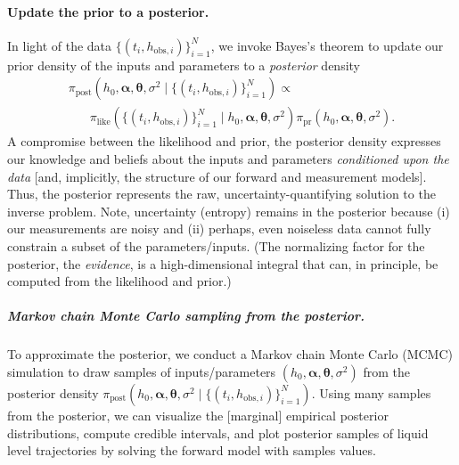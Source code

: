\documentclass[a4paper,fleqn]{cas-dc}
\newcommand\thedata {$\{(t_i,h_{\text{obs}, i})\}_{i=1}^{N}$\xspace}
\newcommand\thedatanomath {\{(t_i,h_{\text{obs}, i})\}_{i=1}^{N}}
\begin{document}
\paragraph{Update the prior to a posterior.}
In light of the data \thedata, we invoke Bayes's theorem  \cite{van2021bayesian,calvetti2018inverse} to update our prior density of the inputs and parameters to a \emph{posterior} density
\begin{multline}
	\pi_{\text{post}}(h_0, \boldsymbol \alpha, \boldsymbol \theta, \sigma^2 \mid \thedatanomath) \propto \\ %
	\phantom{xxx} \pi_{\text{like}}(\thedatanomath \mid h_0,  \boldsymbol \alpha, \boldsymbol \theta, \sigma^2 ) 
	\pi_{\text{pr}}(h_0, \boldsymbol\alpha, \boldsymbol \theta, \sigma^2).
	 \label{eq:post}
\end{multline} 
A compromise between the likelihood and prior,
the posterior density expresses our knowledge and beliefs about the inputs and parameters \emph{conditioned upon the data} [and, implicitly, the structure of our forward and measurement models]. 
Thus, the posterior represents the raw, uncertainty-quantifying solution to the inverse problem.
Note, uncertainty (entropy) remains in the posterior because
 (i) our measurements are noisy and 
 (ii) perhaps, even noiseless data cannot fully constrain a subset of the parameters/inputs.
(The normalizing factor for the posterior, the \emph{evidence}, is a high-dimensional integral that can, in principle, be computed from the likelihood and prior.)


\subparagraph{Markov chain Monte Carlo sampling from the posterior.}
To approximate the posterior, we conduct a Markov chain Monte Carlo (MCMC) simulation \cite{robert1999monte,van2021bayesian} to draw samples of inputs/parameters $(h_0, \boldsymbol \alpha, \boldsymbol \theta, \sigma^2 )$ from the posterior density $\pi_{\text{post}}(h_0, \boldsymbol \alpha, \boldsymbol \theta, \sigma^2 \mid \thedatanomath)$. 
Using many samples from the posterior, we can visualize the [marginal] empirical posterior distributions, compute credible intervals, and plot posterior samples of liquid level trajectories by solving the forward model with samples values.
\end{document}
